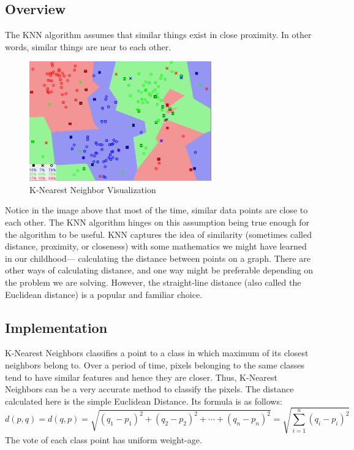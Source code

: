 \documentclass[12pt, a4paper]{report}
\begin{document}
\subsection{Overview}
The KNN algorithm assumes that similar things exist in close proximity. In other words, similar things are near to each other.
\begin{figure}[h]
\centering
\includegraphics[width=0.7\textwidth]{knnone.png}
\caption{K-Nearest Neighbor Visualization}
\end{figure}
Notice in the image above that most of the time, similar data points are close to each other. The KNN algorithm hinges on this assumption being true enough for the algorithm to be useful. KNN captures the idea of similarity (sometimes called distance, proximity, or closeness) with some mathematics we might have learned in our childhood— calculating the distance between points on a graph. There are other ways of calculating distance, and one way might be preferable depending on the problem we are solving. However, the straight-line distance (also called the Euclidean distance) is a popular and familiar choice.

\subsection{Implementation}
K-Nearest Neighbors  classifies a point to a class in which maximum of its closest neighbors belong to. Over a period of time, pixels belonging to the same classes tend to have similar features and hence they are closer. Thus, K-Nearest Neighbors can be a very accurate method to classify the pixels. The distance calculated here is the simple Euclidean Distance. Its formula is as follows:
\begin{displaymath}
d(p, q)=d(q, p)=\sqrt{(q_1-p_1)^2+(q_2-p_2)^2+\cdots+(q_n-p_n)^2}=\sqrt{\sum_{i=1}^{n}(q_i-p_i)^2}
\end{displaymath}
The vote of each class point has uniform weight-age.
\end{document}
